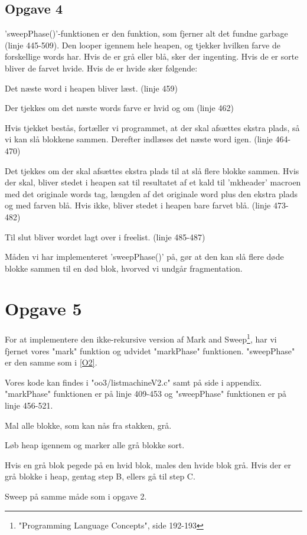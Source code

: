 \subsection{Opgave 4}
\label{O2_4}


'sweepPhase()'-funktionen er den funktion, som fjerner alt det fundne garbage (linje 445-509). Den looper igennem hele heapen, og tjekker hvilken farve de forskellige words har. Hvis de er grå eller blå, sker der ingenting. Hvis de er sorte bliver de farvet hvide. Hvis de er hvide sker følgende:
\begin{my_enumerate}
	\item Det næste word i heapen bliver læst. (linje 459)
	\item Der tjekkes om det næste words farve er hvid og om (linje 462) %
	\item Hvis tjekket bestås, fortæller vi programmet, at der skal afsættes ekstra plads, så vi kan slå blokkene sammen. Derefter indlæses det næste word igen. (linje 464-470)
	\item Det tjekkes om der skal afsættes ekstra plads til at slå flere blokke sammen. Hvis der skal, bliver stedet i heapen sat til resultatet af et kald til 'mkheader' macroen med det originale words tag, længden af det originale word plus den ekstra plads og med farven blå. Hvis ikke, bliver stedet i heapen bare farvet blå. (linje 473-482)
	\item Til slut bliver wordet lagt over i freelist. (linje 485-487)
\end{my_enumerate}

Måden vi har implementeret 'sweepPhase()' på, gør at den kan slå flere døde blokke sammen til en død blok, hvorved vi undgår fragmentation.

\section{Opgave 5}
\label{O5}
For at implementere den ikke-rekursive version af Mark and Sweep\footnote{"Programming Language Concepts", side 192-193}, har vi fjernet vores "mark" funktion og udvidet "markPhase" funktionen. "sweepPhase" er den samme som i \ref{O2}.

Vores kode kan findes i "oo3/listmachineV2.c" samt på side \pageref{Code_V2} i appendix. "markPhase" funktionen er på linje 409-453 og "sweepPhase" funktionen er på linje 456-521.

\begin{my_description}
\item[Step A] Mal alle blokke, som kan nås fra stakken, grå.
\item[Step B] Løb heap igennem og marker alle grå blokke sort. 
	\begin{my_description}
	\item[Step B.1] Hvis en grå blok pegede på en hvid blok, males den hvide blok grå. Hvis der er grå blokke i heap, gentag step B, ellers gå til step C.
	\end{my_description}
\item[Step C] Sweep på samme måde som i opgave 2.
\end{my_description}



